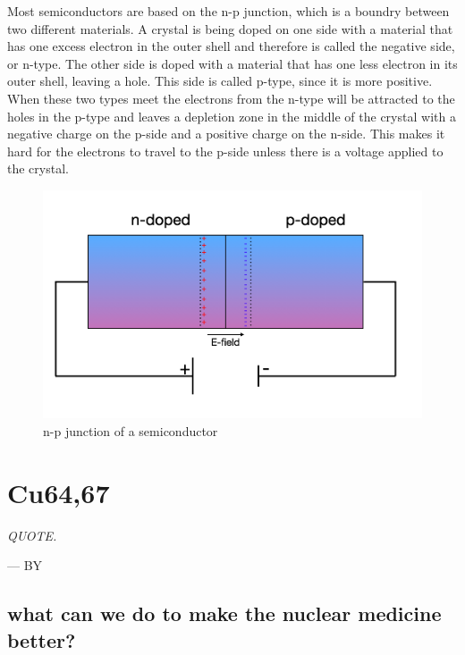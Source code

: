 \documentclass[twoside,english]{uiofysmaster/uiofysmaster}
\begin{document}
Most semiconductors are based on the n-p junction, which is a boundry between two different materials. A crystal is being doped on one side with a material that has one excess electron in the outer shell and therefore is called the negative side, or n-type. The other side is doped with a material that has one less electron in its outer shell, leaving a hole. This side is called p-type, since it is more positive. When these two types meet the electrons from the n-type will be attracted to the holes in the p-type and leaves a depletion zone in the middle of the crystal with a negative charge on the p-side and a positive charge on the n-side. This makes it hard for the electrons to travel to the p-side unless there is a voltage applied to the crystal. 
\begin{figure}[h!]
    \centering
     \includegraphics[scale=0.3]{semiconductor.png}
     \caption{n-p junction of a semiconductor} 
    \label{fig:n-p_junction}
\end{figure}
\noindent




\chapter{Cu64,67} 
\label{ch: mywork}

\epigraph{\itshape QUOTE.}{--- \textup{BY}}


\section{what can we do to make the nuclear medicine better?}
\label{sec: betterwork}
\end{document}
